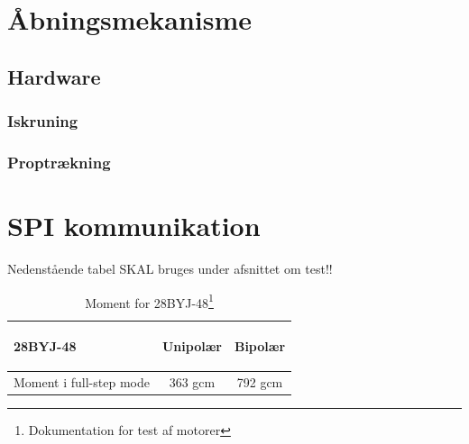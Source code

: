 \section{Åbningsmekanisme}
\label{sec:Aabningsmekanisme}

\subsection{Hardware}
\subsubsection{Iskruning}
\label{sec:HW_Iskruning}

\subsubsection{Proptrækning}
\label{sec:HW_Proptraekning}


\section{SPI kommunikation}
\label{sec:SPI}


Nedenstående tabel SKAL bruges under afsnittet om test!!
\begin{table}[H]
\begin{tabular}{ |l|c|c| }
  \centerline
  \hline
  \textbf{28BYJ-48} & Unipolær & Bipolær\\
  \hline 
  Moment i full-step mode & 363 gcm & 792 gcm \\
  \hline
\end{tabular}
\caption{Moment for 28BYJ-48\footnote{Dokumentation for test af motorer}}\label{tab:motor_moment}
\end{table}